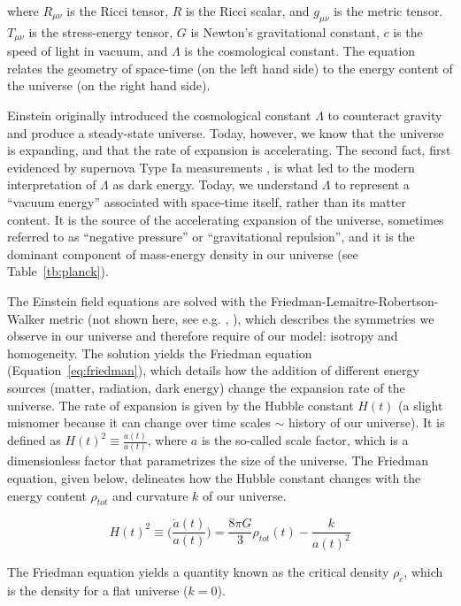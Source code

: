 where $R_{\mu \nu}$ is the Ricci tensor, $R$ is the Ricci scalar, and $g_{\mu\nu}$ is the metric tensor. $T_{\mu \nu}$ is the stress-energy tensor, $G$ is Newton's gravitational constant, $c$ is the speed of light in vacuum, and $\Lambda$ is the cosmological constant. The equation relates the geometry of space-time (on the left hand side) to the energy content of the universe (on the right hand side). 

Einstein originally introduced the cosmological constant $\Lambda$ to counteract gravity and produce a steady-state universe. Today, however, we know that the universe is expanding, and that the rate of expansion is accelerating. The second fact, first evidenced by supernova Type Ia measurements \cite{Riess1998} \cite{Perlmutter1998}, is what led to the modern interpretation of $\Lambda$ as dark energy. Today, we understand  $\Lambda$ to represent a ``vacuum energy'' associated with space-time itself, rather than its matter content. It is the source of the accelerating expansion of the universe, sometimes referred to as ``negative pressure'' or ``gravitational repulsion'', and it is the dominant component of mass-energy density in our universe (see Table~\ref{tb:planck}).

The Einstein field equations are solved with the Friedman-Lemaitre-Robertson-Walker metric (not shown here, see e.g. \cite{Ryden2006}, \cite{Kolb1990}), which describes the symmetries we observe in our universe and therefore require of our model: isotropy and homogeneity. The solution yields the Friedman equation (Equation~\ref{eq:friedman}), which details how the addition of different energy sources (matter, radiation, dark energy) change the expansion rate of the universe. The rate of expansion is given by the Hubble constant $H(t)$ (a slight misnomer because it can change over time scales $\sim$ history of our universe). It is defined as $H(t)^{2} \equiv \frac{\dot{a}(t)}{a(t)}$, where $a$ is the so-called scale factor, which is a dimensionless factor that parametrizes the size of the universe. The Friedman equation, given below, delineates how the Hubble constant changes with the energy content $\rho_{tot}$ and curvature $k$ of our universe.

\begin{equation}
\label{eq:friedman}
H(t)^{2} \equiv \Big( \frac{\dot{a}(t)}{a(t)} \Big) = \frac{8 \pi G}{3} \rho_{tot}(t) - \frac{k}{a(t)^{2}}
\end{equation}

The Friedman equation yields a quantity known as the critical density $\rho_{c}$, which is the density for a flat universe ($k=0$). 

